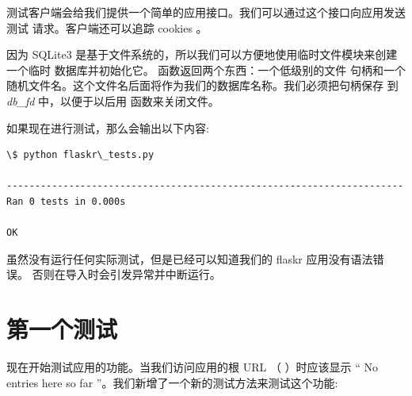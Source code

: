 \documentclass[a4paper,12pt]{sphinxmanual}
\begin{document}
测试客户端会给我们提供一个简单的应用接口。我们可以通过这个接口向应用发送测试
请求。客户端还可以追踪 cookies 。

因为 SQLite3 是基于文件系统的，所以我们可以方便地使用临时文件模块来创建一个临时
数据库并初始化它。 \href{http://docs.python.org/dev/library/tempfile.html\#tempfile.mkstemp}{} 函数返回两个东西：一个低级别的文件
句柄和一个随机文件名。这个文件名后面将作为我们的数据库名称。我们必须把句柄保存
到 \emph{db\_fd} 中，以便于以后用 \href{http://docs.python.org/dev/library/os.html\#os.close}{} 函数来关闭文件。

如果现在进行测试，那么会输出以下内容:

\begin{Verbatim}[commandchars=\\\{\}]
\$ python flaskr\_tests.py

----------------------------------------------------------------------
Ran 0 tests in 0.000s

OK
\end{Verbatim}

虽然没有运行任何实际测试，但是已经可以知道我们的 flaskr 应用没有语法错误。
否则在导入时会引发异常并中断运行。


\section{第一个测试}
\label{testing:id4}
现在开始测试应用的功能。当我们访问应用的根 URL （ \code{/} ）时应该显示
“ No entries here so far ”。我们新增了一个新的测试方法来测试这个功能:
\end{document}
